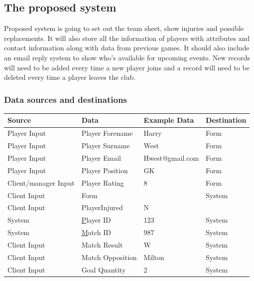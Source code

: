 \subsection{The proposed system}
Proposed system is going to set out the team sheet, show injuries and possible replacements. It will also store all the information of players with attributes and contact information along with data from previous games. It should also include an email reply system to show who's available for upcoming events. New records will need to be added every time a new player joins and a record will need to be deleted every time a player leaves the club.

\subsubsection{Data sources and destinations}
\begin{table}[H]
\centering

\label{my-label}
\begin{tabular}{|l|l|l|l|}
\hline
Source               & Data             & Example Data    & Destination \\ \hline
Player Input         & Player Forename  & Harry           & Form        \\ \hline
Player Input         & Player Surname   & West            & Form        \\ \hline
Player Input         & Player Email     & Hwest@gmail.com & Form        \\ \hline
Player Input         & Player Position  & GK              & Form        \\ \hline
Client/manager Input & Player Rating    & 8               & Form        \\ \hline
Client Input         & Form             &                 & System      \\ \hline
Client Input         & PlayerInjured    & N               &             \\ \hline
System               & {\ul Player ID}  & 123             & System      \\ \hline
System               & {\ul Match ID}   & 987             & System      \\ \hline
Client Input         & Match Result     & W               & System      \\ \hline
Client Input         & Match Opposition & Milton          & System      \\ \hline
Client Input         & Goal Quantity    & 2               & System      \\ \hline
\end{tabular}
\end{table}

